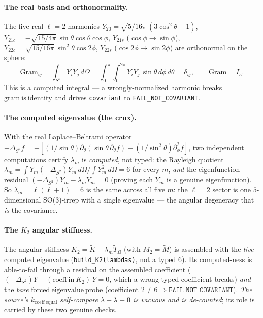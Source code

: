 \paragraph{The real basis and orthonormality.}
The five real \(\ell=2\) harmonics
\(Y_{20}=\sqrt{5/16\pi}\,(3\cos^2\theta-1)\),
\(Y_{21c}=-\sqrt{15/4\pi}\,\sin\theta\cos\theta\cos\phi\),
\(Y_{21s}\) (\(\cos\phi\to\sin\phi\)),
\(Y_{22c}=\sqrt{15/16\pi}\,\sin^2\theta\cos2\phi\),
\(Y_{22s}\) (\(\cos2\phi\to\sin2\phi\)) are orthonormal on the sphere:
\[
  \mathrm{Gram}_{ij}=\int_{S^2} Y_i Y_j\,d\Omega
  =\int_0^\pi\!\!\int_0^{2\pi} Y_i Y_j\,\sin\theta\,d\phi\,d\theta=\delta_{ij},
  \qquad \mathrm{Gram}=I_5.
\]
This is a computed integral --- a wrongly-normalized harmonic breaks
\(\mathrm{gram\ is\ identity}\) and drives \texttt{covariant} to
\texttt{FAIL\_NOT\_COVARIANT}.

\paragraph{The computed eigenvalue (the crux).}
With the real Laplace--Beltrami operator
\(-\Delta_{S^2}f=-[(1/\sin\theta)\partial_\theta(\sin\theta\,\partial_\theta f)+(1/\sin^2\theta)\partial_\phi^2 f]\),
two independent computations certify \(\lambda_m\) is \emph{computed}, not typed: the
Rayleigh quotient \(\lambda_m=\int Y_m(-\Delta_{S^2})Y_m\,d\Omega/\int Y_m^2\,d\Omega=6\)
for every \(m\), \emph{and} the eigenfunction residual
\((-\Delta_{S^2})Y_m-\lambda_m Y_m=0\) (proving each \(Y_m\) is a genuine eigenfunction).
So \(\lambda_m=\ell(\ell+1)=6\) is the same across all five \(m\): the \(\ell=2\) sector
is one \(5\)-dimensional SO(3)-irrep with a single eigenvalue --- the angular degeneracy
that \emph{is} the covariance.

\paragraph{The \texorpdfstring{\(K_2\)}{K2} angular stiffness.}
The angular stiffness \(K_2=\tilde K+\lambda_m\tilde T_\Omega\) (with \(M_2=\tilde M\))
is assembled with the \emph{live} computed eigenvalue (\texttt{build\_K2(lambdas)}, not a
typed \(6\)). Its computed-ness is able-to-fail through a residual on the assembled
coefficient (\((-\Delta_{S^2})Y-(\mathrm{coeff\ in\ }K_2)\,Y=0\), which a wrong typed
coefficient breaks) \emph{and} the \emph{bare} \(\mathrm{forced\ eigenvalue\ probe}\)
(coefficient \(2\ne6\Rightarrow\texttt{FAIL\_NOT\_COVARIANT}\)). \emph{The source's
\(k_{\mathrm{coeff\ equal}}\) self-compare \(\lambda-\lambda\equiv0\) is vacuous and is
de-counted}; its role is carried by these two genuine checks.

